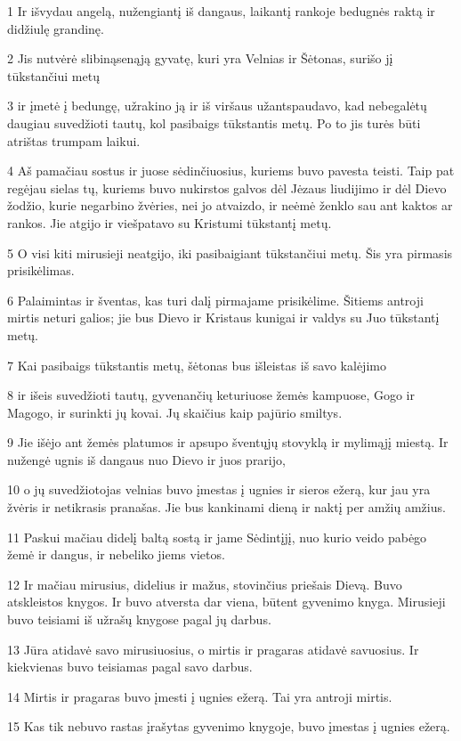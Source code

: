 \par 1 Ir išvydau angelą, nužengiantį iš dangaus, laikantį rankoje bedugnės raktą ir didžiulę grandinę. 
\par 2 Jis nutvėrė slibiną­senąją gyvatę, kuri yra Velnias ir Šėtonas,­ surišo jį tūkstančiui metų 
\par 3 ir įmetė į bedungę, užrakino ją ir iš viršaus užantspaudavo, kad nebegalėtų daugiau suvedžioti tautų, kol pasibaigs tūkstantis metų. Po to jis turės būti atrištas trumpam laikui. 
\par 4 Aš pamačiau sostus ir juose sėdinčiuosius, kuriems buvo pavesta teisti. Taip pat regėjau sielas tų, kuriems buvo nukirstos galvos dėl Jėzaus liudijimo ir dėl Dievo žodžio, kurie negarbino žvėries, nei jo atvaizdo, ir neėmė ženklo sau ant kaktos ar rankos. Jie atgijo ir viešpatavo su Kristumi tūkstantį metų. 
\par 5 O visi kiti mirusieji neatgijo, iki pasibaigiant tūkstančiui metų. Šis yra pirmasis prisikėlimas. 
\par 6 Palaimintas ir šventas, kas turi dalį pirmajame prisikėlime. Šitiems antroji mirtis neturi galios; jie bus Dievo ir Kristaus kunigai ir valdys su Juo tūkstantį metų. 
\par 7 Kai pasibaigs tūkstantis metų, šėtonas bus išleistas iš savo kalėjimo 
\par 8 ir išeis suvedžioti tautų, gyvenančių keturiuose žemės kampuose, Gogo ir Magogo, ir surinkti jų kovai. Jų skaičius kaip pajūrio smiltys. 
\par 9 Jie išėjo ant žemės platumos ir apsupo šventųjų stovyklą ir mylimąjį miestą. Ir nužengė ugnis iš dangaus nuo Dievo ir juos prarijo, 
\par 10 o jų suvedžiotojas velnias buvo įmestas į ugnies ir sieros ežerą, kur jau yra žvėris ir netikrasis pranašas. Jie bus kankinami dieną ir naktį per amžių amžius. 
\par 11 Paskui mačiau didelį baltą sostą ir jame Sėdintįjį, nuo kurio veido pabėgo žemė ir dangus, ir nebeliko jiems vietos. 
\par 12 Ir mačiau mirusius, didelius ir mažus, stovinčius priešais Dievą. Buvo atskleistos knygos. Ir buvo atversta dar viena, būtent gyvenimo knyga. Mirusieji buvo teisiami iš užrašų knygose pagal jų darbus. 
\par 13 Jūra atidavė savo mirusiuosius, o mirtis ir pragaras atidavė savuosius. Ir kiekvienas buvo teisiamas pagal savo darbus. 
\par 14 Mirtis ir pragaras buvo įmesti į ugnies ežerą. Tai yra antroji mirtis. 
\par 15 Kas tik nebuvo rastas įrašytas gyvenimo knygoje, buvo įmestas į ugnies ežerą.


